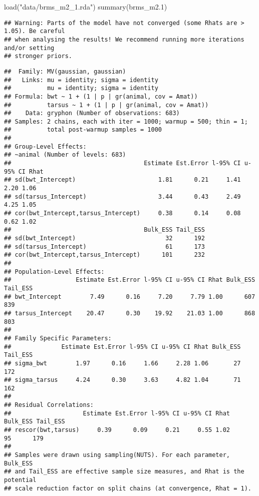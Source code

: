 \documentclass[
  12pt,
]{book}
\newenvironment{Shaded}{\begin{snugshade}}{\end{snugshade}}
\newcommand{\FloatTok}[1]{\textcolor[rgb]{0.00,0.00,0.81}{#1}}
\newcommand{\FunctionTok}[1]{\textcolor[rgb]{0.00,0.00,0.00}{#1}}
\newcommand{\NormalTok}[1]{#1}
\newcommand{\StringTok}[1]{\textcolor[rgb]{0.31,0.60,0.02}{#1}}
\begin{document}
\begin{Shaded}
\begin{Highlighting}[]
\FunctionTok{load}\NormalTok{(}\StringTok{"data/brms\_m2\_1.rda"}\NormalTok{)}
\FunctionTok{summary}\NormalTok{(brms\_m2}\FloatTok{.1}\NormalTok{)}
\end{Highlighting}
\end{Shaded}

\begin{verbatim}
## Warning: Parts of the model have not converged (some Rhats are > 1.05). Be careful
## when analysing the results! We recommend running more iterations and/or setting
## stronger priors.
\end{verbatim}

\begin{verbatim}
##  Family: MV(gaussian, gaussian) 
##   Links: mu = identity; sigma = identity
##          mu = identity; sigma = identity 
## Formula: bwt ~ 1 + (1 | p | gr(animal, cov = Amat)) 
##          tarsus ~ 1 + (1 | p | gr(animal, cov = Amat)) 
##    Data: gryphon (Number of observations: 683) 
## Samples: 2 chains, each with iter = 1000; warmup = 500; thin = 1;
##          total post-warmup samples = 1000
## 
## Group-Level Effects: 
## ~animal (Number of levels: 683) 
##                                     Estimate Est.Error l-95% CI u-95% CI Rhat
## sd(bwt_Intercept)                       1.81      0.21     1.41     2.20 1.06
## sd(tarsus_Intercept)                    3.44      0.43     2.49     4.25 1.05
## cor(bwt_Intercept,tarsus_Intercept)     0.38      0.14     0.08     0.62 1.02
##                                     Bulk_ESS Tail_ESS
## sd(bwt_Intercept)                         32      192
## sd(tarsus_Intercept)                      61      173
## cor(bwt_Intercept,tarsus_Intercept)      101      232
## 
## Population-Level Effects: 
##                  Estimate Est.Error l-95% CI u-95% CI Rhat Bulk_ESS Tail_ESS
## bwt_Intercept        7.49      0.16     7.20     7.79 1.00      607      839
## tarsus_Intercept    20.47      0.30    19.92    21.03 1.00      868      803
## 
## Family Specific Parameters: 
##              Estimate Est.Error l-95% CI u-95% CI Rhat Bulk_ESS Tail_ESS
## sigma_bwt        1.97      0.16     1.66     2.28 1.06       27      172
## sigma_tarsus     4.24      0.30     3.63     4.82 1.04       71      162
## 
## Residual Correlations: 
##                    Estimate Est.Error l-95% CI u-95% CI Rhat Bulk_ESS Tail_ESS
## rescor(bwt,tarsus)     0.39      0.09     0.21     0.55 1.02       95      179
## 
## Samples were drawn using sampling(NUTS). For each parameter, Bulk_ESS
## and Tail_ESS are effective sample size measures, and Rhat is the potential
## scale reduction factor on split chains (at convergence, Rhat = 1).
\end{verbatim}
\end{document}

